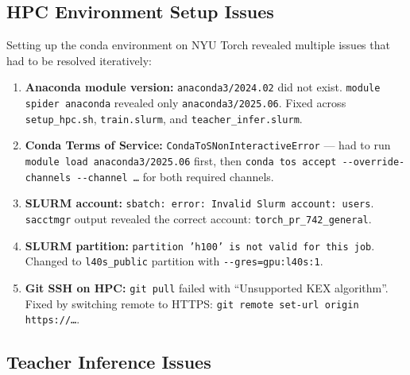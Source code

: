 \documentclass[11pt,a4paper]{article}
\begin{document}
\subsection{HPC Environment Setup Issues}

Setting up the conda environment on NYU Torch revealed multiple issues
that had to be resolved iteratively:

\begin{enumerate}[nosep]
  \item \textbf{Anaconda module version:}
    \texttt{anaconda3/2024.02} did not exist.
    \texttt{module spider anaconda} revealed only \texttt{anaconda3/2025.06}.
    Fixed across \texttt{setup\_hpc.sh}, \texttt{train.slurm}, and
    \texttt{teacher\_infer.slurm}.

  \item \textbf{Conda Terms of Service:}
    \texttt{CondaToSNonInteractiveError} --- had to run
    \texttt{module load anaconda3/2025.06} first, then
    \texttt{conda tos accept -{}-override-channels -{}-channel \ldots}
    for both required channels.

  \item \textbf{SLURM account:}
    \texttt{sbatch: error: Invalid Slurm account: users}.
    \texttt{sacctmgr} output revealed the correct account:
    \texttt{torch\_pr\_742\_general}.

  \item \textbf{SLURM partition:}
    \texttt{partition 'h100' is not valid for this job}.
    Changed to \texttt{l40s\_public} partition with
    \texttt{-{}-gres=gpu:l40s:1}.

  \item \textbf{Git SSH on HPC:}
    \texttt{git pull} failed with ``Unsupported KEX algorithm''.
    Fixed by switching remote to HTTPS:
    \texttt{git remote set-url origin https://\ldots}.
\end{enumerate}

\subsection{Teacher Inference Issues}
\end{document}
